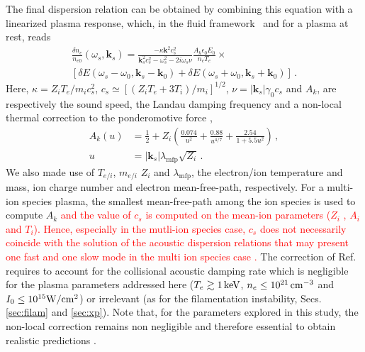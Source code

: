 \documentclass[
 reprint,
 superscriptaddress,
 amsmath,amssymb,
 aps,
]{revtex4-1}
\def\tc{\textcolor{red}}
\begin{document}
The final dispersion relation  can be obtained by combining this equation with a linearized plasma response, which, in the fluid framework~\cite{POP_Ruyer_2020} and for a plasma at rest, %
reads 
\begin{align}
   \frac{\delta n_e }{n_{e0}}(\omega_s,\mathbf{k}_s) = \frac{-\kappa\mathbf{k}^2c_s^2}{ \mathbf{k}_s^2c_s^2-\omega_s^2 -2i\omega_s \nu} \frac{A_k\epsilon_0 E_0}{n_c T_e}\times \nonumber\\ \left[\delta E(\omega_s-\omega_0, \mathbf{k}_s-\mathbf{k}_0) +\delta E(\omega_s+\omega_0, \mathbf{k}_s+\mathbf{k}_0) \right] \, .\label{eq:fluid}
\end{align}
Here, $\kappa = Z_iT_e/m_ic_s^2$,  $c_s\simeq [(Z_iT_e+3 T_i)/m_i]^{1/2}$, $\nu=\vert\mathbf{k}_s\vert \gamma_0 c_s$ and $A_k$, are respectively  the sound speed, the Landau damping frequency and a non-local thermal correction to the ponderomotive force \tc{\cite[]{POP_Kaiser_1993,Bychenkov_2000}}, 
\begin{align}
     A_k(u)   &= \frac{1}{2} +Z_i\left( \frac{0.074}{u^2}+ \frac{0.88}{u^{4/7}} + \frac{2.54}{1+5.5u^2} \right) \, ,\nonumber \\ 
     u &=\vert \mathbf{k}_s \vert\lambda_\mathrm{mfp} \sqrt{Z_i}\label{eq:nl}\, .
\end{align}
We also made use of $T_{e/i}$, $m_{e/i}$ $Z_i$ and $\lambda_\mathrm{mfp}$, the electron/ion temperature and mass, ion charge number and electron mean-free-path, respectively. For a multi-ion species plasma, the smallest mean-free-path among the ion species is used to compute $A_k$ \tc{ and the value of $c_s$ is computed on the mean-ion parameters ($Z_i$ , $A_i$ and $T_i$). Hence, especially in the mutli-ion species case, $c_s$ does not necessarily coincide with the solution of the acoustic dispersion relations that may present one fast and one slow mode in the multi ion species case  \cite[]{POF_Fried_71,POP_Williams_95}.}  
The correction of  Ref. \cite[]{Bychenkov_2000} requires to account for the collisional acoustic damping rate which is negligible for the plasma parameters addressed here ($T_e\gtrsim 1\,\rm keV$, $n_e\le 10^{21}\,\rm cm^{-3}$ and $I_0\le 10^{15}\rm W/cm^{2}$) or irrelevant (as for the filamentation instability, Secs.  \ref{sec:filam} and \ref{sec:xp}).
Note that, for the parameters explored in this study, the non-local correction remains non negligible and therefore essential to obtain realistic predictions \cite[]{PRL_Epperlein_1990,POP_Berger_2005}.  
\end{document}
